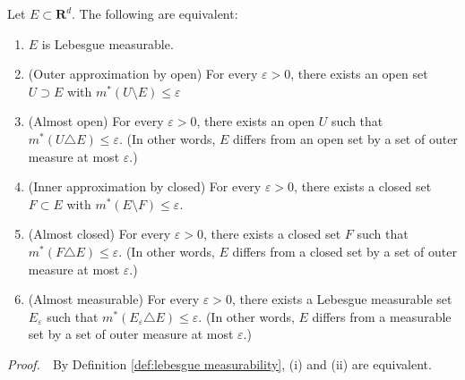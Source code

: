 \documentclass{book}
\theoremstyle{defstyle}
\theoremstyle{thmstyle}
\newcommand{\pff}{\noindent\emph{Proof.}~~}
\begin{document}
\begin{comment}
\begin{remark}
    The properties (iv), (v) and $(vi)$ of Lemma \ref{thm:existence of lebesgue measurable sets} assert that the collection of Lebesgue measurable subsets of $\mathbf{R}^d$ form a \emph{$\sigma$-algebra}.For the property (ii), notice that every closed set $F$ can be represented as the union of compact sets, i.e., $F = \bigcup_{n = 1}^{\infty} F \cap \overline{B(0, n)}$, where $\overline{B(0, n)}$ are closed balls with radius $n$ and centered at origin. Lemma \ref{thm:countable additivity for compact set} shows that compact set satisfying the countable additivity property.
\end{remark}
\end{comment}

\begin{theorem}\label{thm:criteria for measruability}
    Let $E \subset \mathbf{R}^d$. The following are equivalent:
    \begin{enumerate}
        \item $E$ is Lebesgue measurable.
        \item (Outer approximation by open) For every $\varepsilon > 0$, there exists an open set $U \supset E$ with $m^*(U \setminus E) \leq \varepsilon$
        \item (Almost open) For every $\varepsilon > 0$, there exists an open $U$ such that $m^*(U \triangle E) \leq \varepsilon$. (In other words, $E$ differs from an open set by a set of outer measure at most $\varepsilon$.)
        \item (Inner approximation by closed) For every $\varepsilon > 0$, there exists a closed set $F \subset E$ with $m^*(E \setminus F) \leq \varepsilon$.
        \item (Almost closed) For every $\varepsilon > 0$, there exists a closed set $F$ such that $m^*(F \triangle E) \leq \varepsilon$. (In other words, $E$ differs from a closed set by a set of outer measure at most $\varepsilon$.)
        \item (Almost measurable) For every $\varepsilon > 0$, there exists a Lebesgue measurable set $E_\varepsilon$ such that $m^*(E_\varepsilon \triangle E) \leq \varepsilon$. (In other words, $E$ differs from a measurable set by a set of outer measure at most $\varepsilon$.)
    \end{enumerate}
\end{theorem}

\pff By Definition \ref{def:lebesgue measurability}, (i) and (ii) are equivalent.
\end{document}
